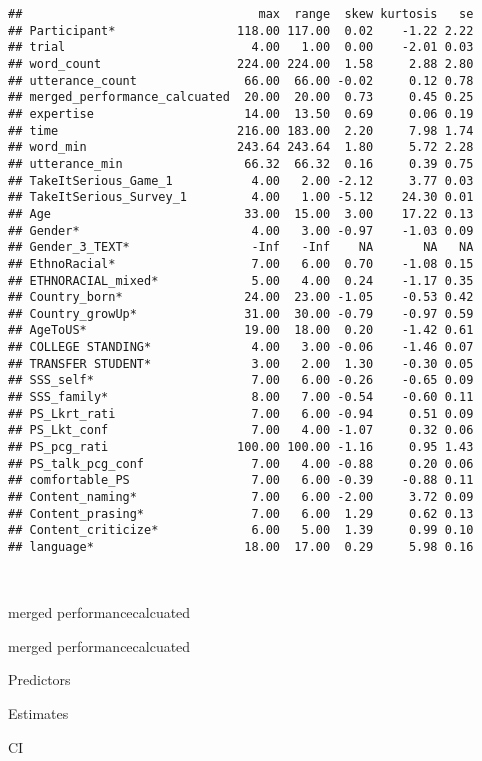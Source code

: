 \documentclass[
]{article}
\begin{document}
\begin{verbatim}
##                                 max  range  skew kurtosis   se
## Participant*                 118.00 117.00  0.02    -1.22 2.22
## trial                          4.00   1.00  0.00    -2.01 0.03
## word_count                   224.00 224.00  1.58     2.88 2.80
## utterance_count               66.00  66.00 -0.02     0.12 0.78
## merged_performance_calcuated  20.00  20.00  0.73     0.45 0.25
## expertise                     14.00  13.50  0.69     0.06 0.19
## time                         216.00 183.00  2.20     7.98 1.74
## word_min                     243.64 243.64  1.80     5.72 2.28
## utterance_min                 66.32  66.32  0.16     0.39 0.75
## TakeItSerious_Game_1           4.00   2.00 -2.12     3.77 0.03
## TakeItSerious_Survey_1         4.00   1.00 -5.12    24.30 0.01
## Age                           33.00  15.00  3.00    17.22 0.13
## Gender*                        4.00   3.00 -0.97    -1.03 0.09
## Gender_3_TEXT*                 -Inf   -Inf    NA       NA   NA
## EthnoRacial*                   7.00   6.00  0.70    -1.08 0.15
## ETHNORACIAL_mixed*             5.00   4.00  0.24    -1.17 0.35
## Country_born*                 24.00  23.00 -1.05    -0.53 0.42
## Country_growUp*               31.00  30.00 -0.79    -0.97 0.59
## AgeToUS*                      19.00  18.00  0.20    -1.42 0.61
## COLLEGE STANDING*              4.00   3.00 -0.06    -1.46 0.07
## TRANSFER STUDENT*              3.00   2.00  1.30    -0.30 0.05
## SSS_self*                      7.00   6.00 -0.26    -0.65 0.09
## SSS_family*                    8.00   7.00 -0.54    -0.60 0.11
## PS_Lkrt_rati                   7.00   6.00 -0.94     0.51 0.09
## PS_Lkt_conf                    7.00   4.00 -1.07     0.32 0.06
## PS_pcg_rati                  100.00 100.00 -1.16     0.95 1.43
## PS_talk_pcg_conf               7.00   4.00 -0.88     0.20 0.06
## comfortable_PS                 7.00   6.00 -0.39    -0.88 0.11
## Content_naming*                7.00   6.00 -2.00     3.72 0.09
## Content_prasing*               7.00   6.00  1.29     0.62 0.13
## Content_criticize*             6.00   5.00  1.39     0.99 0.10
## language*                     18.00  17.00  0.29     5.98 0.16
\end{verbatim}

~

merged performancecalcuated

merged performancecalcuated

Predictors

Estimates

CI
\end{document}
